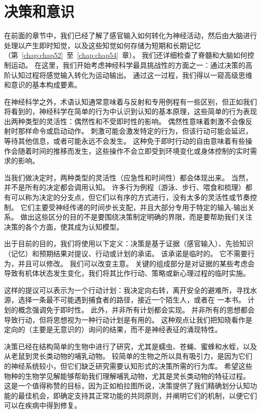 \chapter{决策和意识} \label{chap:chap56}

在前面的章节中，我们已经了解了感官输入如何转化为神经活动，然后由大脑进行处理以产生即时知觉，以及这些知觉如何存储为短期和长期记忆（第~\ref{chap:chap52}~至~\ref{chap:chap54}~章）。
我们还详细检查了脊髓和大脑如何控制运动。
在这里，我们开始考虑神经科学最具挑战性的方面之一：通过决策的高阶认知过程将感觉输入转化为运动输出。
通过这一过程，我们得以一窥高级思维和意识的基本构成要素。


在神经科学之外，术语认知通常意味着与反射和专用例程有一些区别，但正如我们将看到的，神经科学在简单的行为中认识到认知的基本原理，这些简单的行为表现出两种类型的灵活性：偶然性和不受即时性的影响。
偶然性意味着刺激不会像反射时那样命令或启动动作。
刺激可能会激发特定的行为，但该行动可能会延迟，等待其他信息，或者可能永远不会发生。
这种免于即时行动的自由意味着有些操作会随着时间的推移而发生，这些操作不会立即受到环境变化或身体控制的实时需求的影响。


当我们做决定时，两种类型的灵活性（应急性和时间性）都会体现出来。
当然，并不是所有的决定都会调用认知。
许多行为例程（游泳、步行、喂食和梳理）都有可以称为决定的分支点，但它们以有序的方式进行，没有太多的灵活性或节奏控制。
它们主要受神经传递的时间步长支配，并且大部分专用于特定的输入-输出关系。
做出这些区分的目的不是要围绕决策制定明确的界限，而是要帮助我们关注决策的各个方面，使其成为认知模型。


出于目前的目的，我们将使用以下定义：决策是基于证据（感官输入）、先验知识（记忆）和预期结果对提议、行动或计划的承诺。
该承诺是临时的。
它不需要行为，并且可以修改。
我们可以改变主意。
关键的组成部分是对证据的某些考虑会导致有机体状态发生变化，我们将其比作行动、策略或新心理过程的临时实施。


这样的提议可以表示为一个行动计划：我决定向右转，离开安全的避难所，寻找水源，选择一条最不可能遇到捕食者的路径，接近一个陌生人，或者在 一本书。
计划的概念强调免于即时性。
此外，并非所有计划都会实现。 并非所有的思想都会导致行动，但将思想视为一种行动计划是有用的。
这种观点让我们把知晓看作是定向的（主要是无意识的）询问的结果，而不是神经表征的涌现特性。


决策已经在结构简单的生物中进行了研究，尤其是蠕虫、苍蝇、蜜蜂和水蛭，以及从老鼠到灵长类动物的哺乳动物。
较简单的生物之所以具有吸引力，是因为它们的神经系统较小，但它们缺乏研究需要认知形式的决策所需的行为库。
希望这些物种的生物学见解能够帮助我们理解哺乳动物，尤其是灵长类动物的特征过程。
这是一个值得称赞的目标，因为正如柏拉图所说，决策提供了我们精确划分认知功能的最佳机会，即确定支持其正常功能的共同原则，并阐明它们的机制，以便它们可以在疾病中得到修复。


